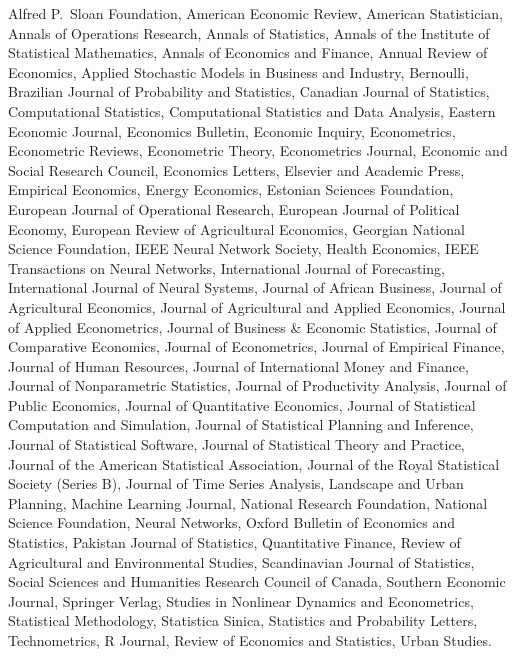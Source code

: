 \documentclass[
]{article}
\begin{document}
Alfred P.~Sloan Foundation, American Economic Review, American
Statistician, Annals of Operations Research, Annals of Statistics,
Annals of the Institute of Statistical Mathematics, Annals of Economics
and Finance, Annual Review of Economics, Applied Stochastic Models in
Business and Industry, Bernoulli, Brazilian Journal of Probability and
Statistics, Canadian Journal of Statistics, Computational Statistics,
Computational Statistics and Data Analysis, Eastern Economic Journal,
Economics Bulletin, Economic Inquiry, Econometrics, Econometric Reviews,
Econometric Theory, Econometrics Journal, Economic and Social Research
Council, Economics Letters, Elsevier and Academic Press, Empirical
Economics, Energy Economics, Estonian Sciences Foundation, European
Journal of Operational Research, European Journal of Political Economy,
European Review of Agricultural Economics, Georgian National Science
Foundation, IEEE Neural Network Society, Health Economics, IEEE
Transactions on Neural Networks, International Journal of Forecasting,
International Journal of Neural Systems, Journal of African Business,
Journal of Agricultural Economics, Journal of Agricultural and Applied
Economics, Journal of Applied Econometrics, Journal of Business \&
Economic Statistics, Journal of Comparative Economics, Journal of
Econometrics, Journal of Empirical Finance, Journal of Human Resources,
Journal of International Money and Finance, Journal of Nonparametric
Statistics, Journal of Productivity Analysis, Journal of Public
Economics, Journal of Quantitative Economics, Journal of Statistical
Computation and Simulation, Journal of Statistical Planning and
Inference, Journal of Statistical Software, Journal of Statistical
Theory and Practice, Journal of the American Statistical Association,
Journal of the Royal Statistical Society (Series B), Journal of Time
Series Analysis, Landscape and Urban Planning, Machine Learning Journal,
National Research Foundation, National Science Foundation, Neural
Networks, Oxford Bulletin of Economics and Statistics, Pakistan Journal
of Statistics, Quantitative Finance, Review of Agricultural and
Environmental Studies, Scandinavian Journal of Statistics, Social
Sciences and Humanities Research Council of Canada, Southern Economic
Journal, Springer Verlag, Studies in Nonlinear Dynamics and
Econometrics, Statistical Methodology, Statistica Sinica, Statistics and
Probability Letters, Technometrics, R Journal, Review of Economics and
Statistics, Urban Studies.
\end{document}
